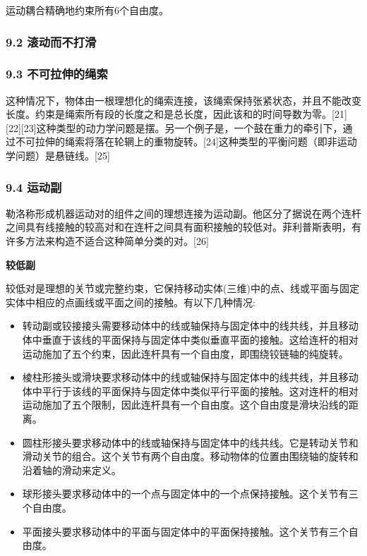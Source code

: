 运动耦合精确地约束所有6个自由度。

\subsubsection{9.2 滚动而不打滑}



\subsubsection{9.3 不可拉伸的绳索}

这种情况下，物体由一根理想化的绳索连接，该绳索保持张紧状态，并且不能改变长度。约束是绳索所有段的长度之和是总长度，因此该和的时间导数为零。[21][22][23]这种类型的动力学问题是摆。另一个例子是，一个鼓在重力的牵引下，通过不可拉伸的绳索将落在轮辋上的重物旋转。[24]这种类型的平衡问题（即非运动学问题）是悬链线。[25]

\subsubsection{9.4 运动副}

勒洛称形成机器运动对的组件之间的理想连接为运动副。他区分了据说在两个连杆之间具有线接触的较高对和在连杆之间具有面积接触的较低对。菲利普斯表明，有许多方法来构造不适合这种简单分类的对。[26]

\textbf{较低副}

较低对是理想的关节或完整约束，它保持移动实体(三维)中的点、线或平面与固定实体中相应的点画线或平面之间的接触。有以下几种情况:

\begin{itemize}
\item 转动副或铰接接头需要移动体中的线或轴保持与固定体中的线共线，并且移动体中垂直于该线的平面保持与固定体中类似垂直平面的接触。这给连杆的相对运动施加了五个约束，因此连杆具有一个自由度，即围绕铰链轴的纯旋转。
\item 棱柱形接头或滑块要求移动体中的线或轴保持与固定体中的线共线，并且移动体中平行于该线的平面保持与固定体中类似平行平面的接触。这对连杆的相对运动施加了五个限制，因此连杆具有一个自由度。这个自由度是滑块沿线的距离。
\item 圆柱形接头要求移动体中的线或轴保持与固定体中的线共线。它是转动关节和滑动关节的组合。这个关节有两个自由度。移动物体的位置由围绕轴的旋转和沿着轴的滑动来定义。
\item 球形接头要求移动体中的一个点与固定体中的一个点保持接触。这个关节有三个自由度。
\item 平面接头要求移动体中的平面与固定体中的平面保持接触。这个关节有三个自由度。
\end{itemize}


